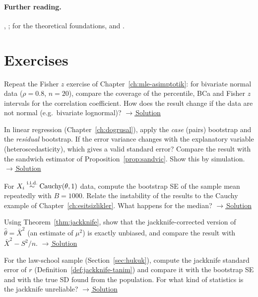 \documentclass[main.tex]{subfiles}
\begin{document}
\paragraph{Further reading.} \cite{efron-tib}, \cite{davison}; for the theoretical foundations, \cite{hall} and \cite[Chapter~23]{vdv}.

\section{Exercises}

\begin{exercise}\label{exr:18-1}
Repeat the Fisher $z$ exercise of Chapter~\ref{ch:mle-asimptotik}: for bivariate normal data ($\rho=0.8$, $n=20$), compare the coverage of the percentile, BCa and Fisher $z$ intervals for the correlation coefficient. How does the result change if the data are not normal (e.g.\ bivariate lognormal)?
\hfill\hyperref[coz:18-1]{\footnotesize$\rightarrow$\,Solution}
\end{exercise}

\begin{exercise}\label{exr:18-2}
In linear regression (Chapter~\ref{ch:dogrusal}), apply the \emph{case} (pairs) bootstrap and the \emph{residual} bootstrap. If the error variance changes with the explanatory variable (heteroscedasticity), which gives a valid standard error? Compare the result with the sandwich estimator of Proposition~\ref{prop:sandvic}. Show this by simulation.
\hfill\hyperref[coz:18-2]{\footnotesize$\rightarrow$\,Solution}
\end{exercise}

\begin{exercise}\label{exr:18-3}
For $X_i\overset{\text{i.i.d.}}{\sim}\text{Cauchy}(\theta,1)$ data, compute the bootstrap SE of the sample mean repeatedly with $B=1000$. Relate the instability of the results to the Cauchy example of Chapter~\ref{ch:esitsizlikler}. What happens for the median?
\hfill\hyperref[coz:18-3]{\footnotesize$\rightarrow$\,Solution}
\end{exercise}

\begin{exercise}\label{exr:18-4}
Using Theorem~\ref{thm:jackknife}, show that the jackknife-corrected version of $\hat\theta=\bar X^2$ (an estimate of $\mu^2$) is exactly unbiased, and compare the result with $\bar X^2-S^2/n$.
\hfill\hyperref[coz:18-4]{\footnotesize$\rightarrow$\,Solution}
\end{exercise}

\begin{exercise}\label{exr:18-5}
For the law-school sample (Section~\ref{sec:hukuk}), compute the jackknife standard error of $r$ (Definition~\ref{def:jackknife-tanim}) and compare it with the bootstrap SE and with the true SD found from the population. For what kind of statistics is the jackknife unreliable?
\hfill\hyperref[coz:18-5]{\footnotesize$\rightarrow$\,Solution}
\end{exercise}

\end{document}
